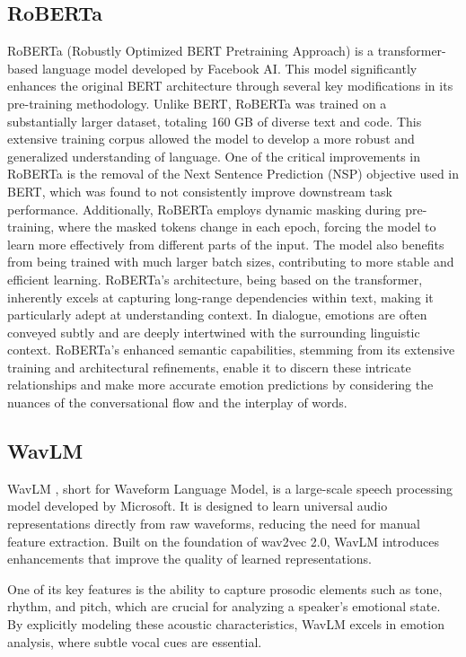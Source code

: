 \documentclass{article}
\begin{document}
\subsection{RoBERTa}
RoBERTa (Robustly Optimized BERT Pretraining Approach)  \cite{liu2019roberta}is a transformer-based language model developed by Facebook AI. This model significantly enhances the original BERT architecture through several key modifications in its pre-training methodology. Unlike BERT, RoBERTa was trained on a substantially larger dataset, totaling 160 GB of diverse text and code. This extensive training corpus allowed the model to develop a more robust and generalized understanding of language. One of the critical improvements in RoBERTa is the removal of the Next Sentence Prediction (NSP) objective used in BERT, which was found to not consistently improve downstream task performance. Additionally, RoBERTa employs dynamic masking during pre-training, where the masked tokens change in each epoch, forcing the model to learn more effectively from different parts of the input. The model also benefits from being trained with much larger batch sizes, contributing to more stable and efficient learning. RoBERTa's architecture, being based on the transformer, inherently excels at capturing long-range dependencies within text, making it particularly adept at understanding context. In dialogue, emotions are often conveyed subtly and are deeply intertwined with the surrounding linguistic context. RoBERTa's enhanced semantic capabilities, stemming from its extensive training and architectural refinements, enable it to discern these intricate relationships and make more accurate emotion predictions by considering the nuances of the conversational flow and the interplay of words.

\subsection{WavLM}
WavLM \cite{chen2021wavlm}, short for Waveform Language Model, is a large-scale speech processing model developed by Microsoft. It is designed to learn universal audio representations directly from raw waveforms, reducing the need for manual feature extraction. Built on the foundation of wav2vec 2.0, WavLM introduces enhancements that improve the quality of learned representations. 

One of its key features is the ability to capture prosodic elements such as tone, rhythm, and pitch, which are crucial for analyzing a speaker's emotional state. By explicitly modeling these acoustic characteristics, WavLM excels in emotion analysis, where subtle vocal cues are essential.
\end{document}
